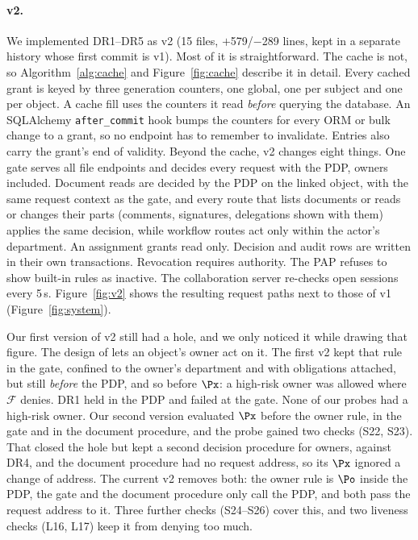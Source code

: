 \paragraph{\sysname v2.} We implemented DR1--DR5 as v2 (15 files, $+$579/$-$289 lines, kept in a separate
history whose first commit is v1). Most of it is straightforward. The cache is not, so Algorithm~\ref{alg:cache} and
Figure~\ref{fig:cache} describe it in detail. Every cached grant is keyed by three generation counters, one global, one per
subject and one per object. A cache fill uses the counters it read \emph{before} querying the database. An
SQLAlchemy \texttt{after\_commit} hook bumps the counters for every ORM or bulk change to a grant, so no endpoint
has to remember to invalidate. Entries also carry the grant's end of validity. Beyond the cache, v2 changes
eight things. One gate serves all file endpoints and decides every request with the PDP, owners included.
Document reads are decided by the PDP on the linked object, with the same request context as the gate, and
every route that lists documents or reads or changes their parts (comments, signatures, delegations shown with
them) applies the same decision, while workflow routes act only within the actor's department. An assignment
grants read only.
Decision and audit rows are written in their own transactions. Revocation requires authority. The PAP refuses to
show built-in rules as inactive. The collaboration server re-checks open sessions every 5\,s. Figure~\ref{fig:v2} shows the
resulting request paths next to those of v1 (Figure~\ref{fig:system}).

Our first version of v2 still had a hole, and we only noticed it while drawing that figure. The design of
\sysname lets an object's owner act on it. The first v2 kept that rule in the gate, confined to the owner's
department and with obligations attached, but still \emph{before} the PDP, and so before $\Px$: a high-risk owner
was allowed where $\mathcal{F}$ denies. DR1 held in the PDP and failed at the gate. None of our probes had a
high-risk owner. Our second version evaluated $\Px$ before the owner rule, in the gate and in the document
procedure, and the probe gained two checks (S22, S23). That closed the hole but kept a second decision procedure
for owners, against DR4, and the document procedure had no request address, so its $\Px$ ignored a change of
address. The current v2 removes both: the owner rule is $\Po$ inside the PDP, the gate and the document procedure
only call the PDP, and both pass the request address to it. Three further checks (S24--S26) cover this, and two
liveness checks (L16, L17) keep it from denying too much.

